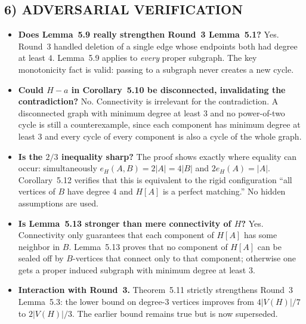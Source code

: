 \subsection*{6) ADVERSARIAL VERIFICATION}
\begin{itemize}
  \item \textbf{Does Lemma~5.9 really strengthen Round~3 Lemma~5.1?} Yes. Round~3 handled deletion of a single edge whose endpoints both had degree at least $4$. Lemma~5.9 applies to \emph{every} proper subgraph. The key monotonicity fact is valid: passing to a subgraph never creates a new cycle.

  \item \textbf{Could $H-a$ in Corollary~5.10 be disconnected, invalidating the contradiction?} No. Connectivity is irrelevant for the contradiction. A disconnected graph with minimum degree at least $3$ and no power-of-two cycle is still a counterexample, since each component has minimum degree at least $3$ and every cycle of every component is also a cycle of the whole graph.

  \item \textbf{Is the $2/3$ inequality sharp?} The proof shows exactly where equality can occur: simultaneously $e_H(A,B)=2|A|=4|B|$ and $2e_H(A)=|A|$. Corollary~5.12 verifies that this is equivalent to the rigid configuration ``all vertices of $B$ have degree $4$ and $H[A]$ is a perfect matching.'' No hidden assumptions are used.

  \item \textbf{Is Lemma~5.13 stronger than mere connectivity of $H$?} Yes. Connectivity only guarantees that each component of $H[A]$ has some neighbor in $B$. Lemma~5.13 proves that no component of $H[A]$ can be sealed off by $B$-vertices that connect only to that component; otherwise one gets a proper induced subgraph with minimum degree at least $3$.

  \item \textbf{Interaction with Round~3.} Theorem~5.11 strictly strengthens Round~3 Lemma~5.3: the lower bound on degree-$3$ vertices improves from $4|V(H)|/7$ to $2|V(H)|/3$. The earlier bound remains true but is now superseded.
\end{itemize}

